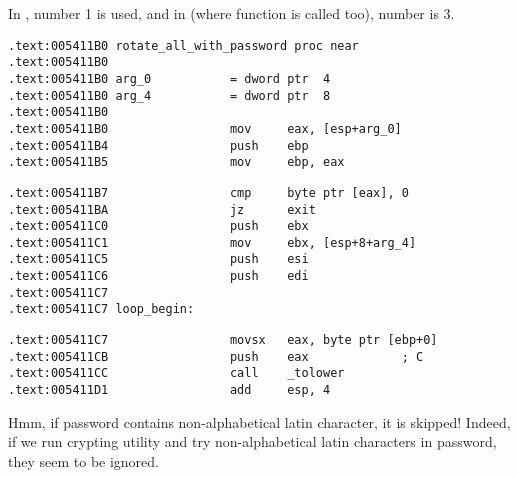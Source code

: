 {In , number 1 is used, and in  (where  function 
is called too), number is 3.}

\begin{lstlisting}
.text:005411B0 rotate_all_with_password proc near
.text:005411B0
.text:005411B0 arg_0           = dword ptr  4
.text:005411B0 arg_4           = dword ptr  8
.text:005411B0
.text:005411B0                 mov     eax, [esp+arg_0]
.text:005411B4                 push    ebp
.text:005411B5                 mov     ebp, eax
\end{lstlisting}


\begin{lstlisting}
.text:005411B7                 cmp     byte ptr [eax], 0
.text:005411BA                 jz      exit
.text:005411C0                 push    ebx
.text:005411C1                 mov     ebx, [esp+8+arg_4]
.text:005411C5                 push    esi
.text:005411C6                 push    edi
.text:005411C7
.text:005411C7 loop_begin:
\end{lstlisting}


\begin{lstlisting}
.text:005411C7                 movsx   eax, byte ptr [ebp+0]
.text:005411CB                 push    eax             ; C
.text:005411CC                 call    _tolower
.text:005411D1                 add     esp, 4
\end{lstlisting}

{Hmm, if password contains non-alphabetical latin character, it is skipped! 
Indeed, if we run crypting utility and try non-alphabetical latin characters in password, 
they seem to be ignored.}

